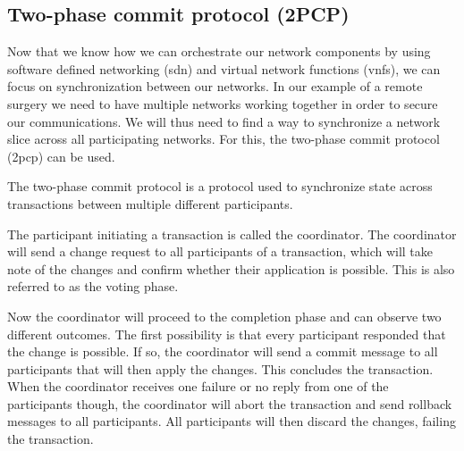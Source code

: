 
\subsection{Two-phase commit protocol (2PCP)}
Now that we know how we can orchestrate our network components by using software defined networking (\acrshort{sdn}) and virtual network functions (\acrshort{vnf}s), we can focus on synchronization between our networks. In our example of a remote surgery we need to have multiple networks working together in order to secure our communications. We will thus need to find a way to synchronize a network slice across all participating networks. For this, the two-phase commit protocol (\acrshort{2pcp}) can be used.

The two-phase commit protocol \cite{2pcp} is a protocol used to synchronize state across transactions between multiple different participants.

The participant initiating a transaction is called the coordinator. The coordinator will send a change request to all participants of a transaction, which will take note of the changes and confirm whether their application is possible. This is also referred to as the voting phase.

Now the coordinator will proceed to the completion phase and can observe two different outcomes. The first possibility is that every participant responded that the change is possible. If so, the coordinator will send a commit message to all participants that will then apply the changes. This concludes the transaction. When the coordinator receives one failure or no reply from one of the participants though, the coordinator will abort the transaction and send rollback messages to all participants. All participants will then discard the changes, failing the transaction.

